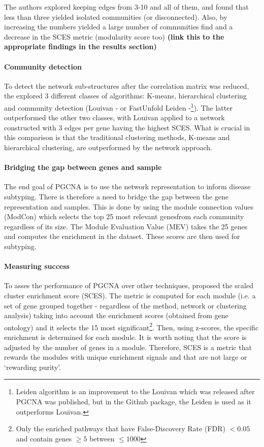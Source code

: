The authors explored keeping edges from 3-10 and all of them, and found that less than three yielded isolated communities (or disconnected). Also, by increasing the numbers yielded a large number of communities find and a decrease in the SCES metric (modularity score too) \textbf{(link this to the appropriate findings in the results section)}

\paragraph*{Community detection}

To detect the network sub-structures after the correlation matrix was reduced, the \citet{Care2019-ij} explored 3 different classes of algorithms: K-means, hierarchical clustering and community detection (Louivan - \citet{Blondel2008-ik} or FastUnfold Leiden -\citet{Traag2019-ne}\footnote{Leiden algorithm is an improvement to the Louivan which was released after PGCNA was published, but in the Github package, the Leiden is used as it outperforms Louivan.}). The latter outperformed the other two classes, with Louivan applied to a network constructed with 3 edges per gene having the highest SCES. What is crucial in this comparison is that the traditional clustering methods, K-means and hierarchical clustering, are outperformed by the network approach.

\paragraph*{Bridging the gap between genes and sample}

The end goal of PGCNA is to use the network representation to inform disease subtyping. There is therefore a need to bridge the gap between the gene representation and samples. This is done by using the module connection values (ModCon) which selects the top 25 most relevant genesfrom each community regardless of its size. The Module Evaluation Value (MEV) takes the 25 genes and computes the enrichment in the dataset. These scores are then used for subtyping. 

\paragraph*{Measuring success} 

To asses the performance of PGCNA over other techniques, \citet{Care2019-ij} proposed the scaled cluster enrichment score (SCES). The metric is computed for each module (i.e. a set of gene grouped together - regardless of the method, network or clustering analysis) taking into account the enrichment scores (obtained from gene ontology) and it selects the 15 most significant\footnote{Only the enriched pathways that have False-Discovery Rate (FDR) $<0.05$ and contain genes $\geq5$ between $\leq1000$}. Then, using z-scores, the specific enrichment is determined for each module. It is worth noting that the score is adjusted by the number of genes in a module. Therefore, SCES is a metric that rewards the modules with unique enrichment signals and that are not large or ‘rewarding purity'\cite{Care2019-ij}.

